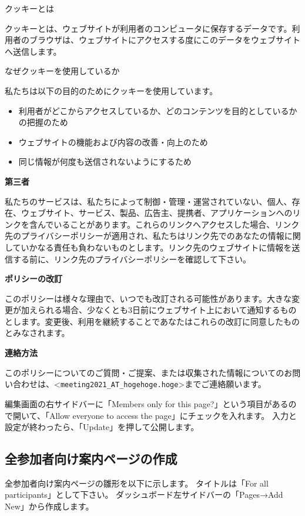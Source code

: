 \documentclass[titlepage,10pt,a4paper,uplatex]{jsbook}
\newenvironment{content}{\begin{shaded}\vspace{-1em}\raggedright\ttfamily\footnotesize\setlength{\baselineskip}{1.4em}}{\end{shaded}\vspace{-1em}}
\renewcommand{\textbf}[1]{{\bfseries\sffamily#1}}
\begin{document}
\begin{content}
{\Large クッキーとは}

クッキーとは、ウェブサイトが利用者のコンピュータに保存するデータです。利用者のブラウザは、ウェブサイトにアクセスする度にこのデータをウェブサイトへ送信します。

{\Large なぜクッキーを使用しているか}

私たちは以下の目的のためにクッキーを使用しています。

\begin{itemize}
\item 利用者がどこからアクセスしているか、どのコンテンツを目的としているかの把握のため
\item ウェブサイトの機能および内容の改善・向上のため
\item 同じ情報が何度も送信されないようにするため
\end{itemize}

\textbf{\Large 第三者}

私たちのサービスは、私たちによって制御・管理・運営されていない、個人、存在、ウェブサイト、サービス、製品、広告主、提携者、アプリケーションへのリンクを含んでいることがあります。これらのリンクへアクセスした場合、リンク先のプライバシーポリシーが適用され、私たちはリンク先でのあなたの情報に関していかなる責任も負わないものとします。リンク先のウェブサイトに情報を送信する前に、リンク先のプライバシーポリシーを確認して下さい。

\textbf{\Large ポリシーの改訂}

このポリシーは様々な理由で、いつでも改訂される可能性があります。大きな変更が加えられる場合、少なくとも3日前にウェブサイト上において通知するものとします。変更後、利用を継続することであなたはこれらの改訂に同意したものとみなされます。

\textbf{\Large 連絡方法}

このポリシーについてのご質問・ご提案、または収集された情報についてのお問い合わせは、{\textless}\texttt{meeting2021\_AT\_hogehoge.hoge}{\textgreater}までご連絡願います。
\end{content}

編集画面の右サイドバーに「Members only for this page?」という項目があるので開いて、「Allow everyone to access the page」にチェックを入れます。
入力と設定が終わったら、「Update」を押して公開します。

\subsection{全参加者向け案内ページの作成}

全参加者向け案内ページの雛形を以下に示します。
タイトルは「For all participants」として下さい。
ダッシュボード左サイドバーの「Pages→Add New」から作成します。
\end{document}
